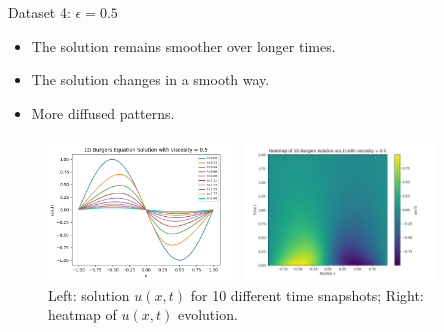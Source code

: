 \begin{secframe}

\begin{block}{Dataset 4: $\epsilon = 0.5$}
\begin{itemize}
  \item \small The solution remains smoother over longer times.
  \item \small The solution changes in a smooth way.
  \item \small More diffused patterns. 
\end{itemize}
\end{block}

\begin{figure}[h!]
    \centering
    \begin{minipage}[t]{0.48\linewidth}
        \centering
        \includegraphics[height=3.8cm]{images/burger/graphical_visualization_1DBurgers_visc_05.png}
    \end{minipage}\hfill
    \begin{minipage}[t]{0.48\linewidth}
        \centering
        \includegraphics[height=3.8cm]{images/burger/Heatmap_1DBurgers_visc_05.png}
    \end{minipage}
    \caption{\scriptsize Left: solution $u(x,t)$ for 10 different time snapshots; Right: heatmap of $u(x,t)$ evolution.}
\end{figure}
\end{secframe}